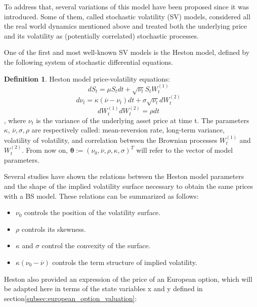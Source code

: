 \documentclass[12,twoside]{mammeTFM}
\theoremstyle{definition}
\newtheorem{definition}[thm]{Definition}
\theoremstyle{remark}
\begin{document}
To address that, several variations of this model have been proposed since it was introduced. Some of them, called stochastic volatility (SV) models, considered all the real world dynamics mentioned above and treated both the underlying price and its volatility as (potentially correlated) stochastic processes.

One of the first and most well-known SV models is the Heston model, defined by the following system of stochastic differential equations.

\begin{definition} Heston model price-volatility equations:
$$
dS_t = \mu S_t dt + \sqrt{\nu_t} S_t W_t^{(1)}
$$
$$
d\nu_t = \kappa(\overline{\nu} - \nu_t) dt + \sigma \sqrt{\nu_t}dW_t^{(2)}
$$
$$
dW_t^{(1)}dW_t^{(2)} = \rho dt
$$
, where $\nu_t$ is the variance of the underlying asset price at time t. The parameters $\kappa$, $\overline{\nu}, \sigma, \rho$ are respectively called: mean-reversion rate, long-term variance, volatility of volatility, and correlation between the Brownian processes $W_t^{(1)}$ and $W_t^{(2)}$. From now on, $\boldsymbol{\theta} := (\nu_0, \overline{\nu}, \rho, \kappa, \sigma)^T$ will refer to the vector of model parameters.
\end{definition}

Several studies have shown the relations between the Heston model parameters and the shape of the implied volatility surface \cite{cla11, gat06, gil12, jan11} necessary to obtain the same prices with a BS model. These relations can be summarized as follows:

\begin{itemize} \label{hes_param_properties}
\item $\nu_0$ controls the position of the volatility surface.
\item $\rho$ controls its skewness.
\item $\kappa$ and $\sigma$ control the convexity of the surface.
\item $\kappa(\nu_0 - \overline{\nu})$ controls the term structure of implied volatility.
\end{itemize}

Heston also provided an expression of the price of an European option, which will be adapted here in terms of the state variables x and y defined in section\ref{subsec:european_option_valuation}:
\end{document}
